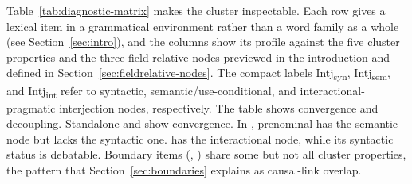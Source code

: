 \documentclass[12pt]{article}
\begin{document}
Table~\ref{tab:diagnostic-matrix} makes the cluster inspectable.
Each row gives a lexical item in a grammatical environment rather than
a word family as a whole (see Section~\ref{sec:intro}), and the columns show its
profile against the five cluster properties and the three field-relative
nodes previewed in the introduction and defined in
Section~\ref{sec:fieldrelative-nodes}. The compact labels
Intj\textsubscript{syn}, Intj\textsubscript{sem}, and
Intj\textsubscript{int} refer to syntactic, semantic/use-conditional,
and interactional-pragmatic interjection nodes, respectively. The table
shows convergence and decoupling. Standalone  and
 show convergence. In , prenominal
 has the semantic node but lacks the syntactic one.
 has the interactional node, while its syntactic status
is debatable. Boundary items (, ) share some
but not all cluster properties, the pattern that
Section~\ref{sec:boundaries} explains as causal-link overlap.
\end{document}
